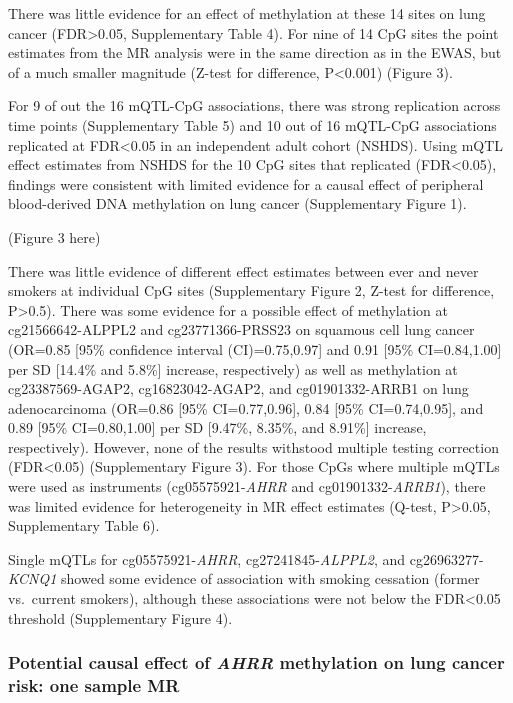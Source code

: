\documentclass[11pt,twoside]{bristolthesis}
\begin{document}
There was little evidence for an effect of methylation at these 14 sites on lung cancer (FDR\textgreater0.05, Supplementary Table 4). For nine of 14 CpG sites the point estimates from the MR analysis were in the same direction as in the EWAS, but of a much smaller magnitude (Z-test for difference, P\textless0.001) (Figure 3).

For 9 of out the 16 mQTL-CpG associations, there was strong replication across time points (Supplementary Table 5) and 10 out of 16 mQTL-CpG associations replicated at FDR\textless0.05 in an independent adult cohort (NSHDS). Using mQTL effect estimates from NSHDS for the 10 CpG sites that replicated (FDR\textless0.05), findings were consistent with limited evidence for a causal effect of peripheral blood-derived DNA methylation on lung cancer (Supplementary Figure 1).

(Figure 3 here)

There was little evidence of different effect estimates between ever and never smokers at individual CpG sites (Supplementary Figure 2, Z-test for difference, P\textgreater0.5). There was some evidence for a possible effect of methylation at cg21566642-ALPPL2 and cg23771366-PRSS23 on squamous cell lung cancer (OR=0.85 {[}95\% confidence interval (CI)=0.75,0.97{]} and 0.91 {[}95\% CI=0.84,1.00{]} per SD {[}14.4\% and 5.8\%{]} increase, respectively) as well as methylation at cg23387569-AGAP2, cg16823042-AGAP2, and cg01901332-ARRB1 on lung adenocarcinoma (OR=0.86 {[}95\% CI=0.77,0.96{]}, 0.84 {[}95\% CI=0.74,0.95{]}, and 0.89 {[}95\% CI=0.80,1.00{]} per SD {[}9.47\%, 8.35\%, and 8.91\%{]} increase, respectively). However, none of the results withstood multiple testing correction (FDR\textless0.05) (Supplementary Figure 3). For those CpGs where multiple mQTLs were used as instruments (cg05575921-\emph{AHRR} and cg01901332-\emph{ARRB1}), there was limited evidence for heterogeneity in MR effect estimates (Q-test, P\textgreater0.05, Supplementary Table 6).

Single mQTLs for cg05575921-\emph{AHRR}, cg27241845-\emph{ALPPL2}, and cg26963277-\emph{KCNQ1} showed some evidence of association with smoking cessation (former vs.~current smokers), although these associations were not below the FDR\textless0.05 threshold (Supplementary Figure 4).

\hypertarget{potential-causal-effect-of-ahrr-methylation-on-lung-cancer-risk-one-sample-mr}{%
\subsubsection{\texorpdfstring{Potential causal effect of \emph{AHRR} methylation on lung cancer risk: one sample MR}{Potential causal effect of AHRR methylation on lung cancer risk: one sample MR}}\label{potential-causal-effect-of-ahrr-methylation-on-lung-cancer-risk-one-sample-mr}}
\end{document}
